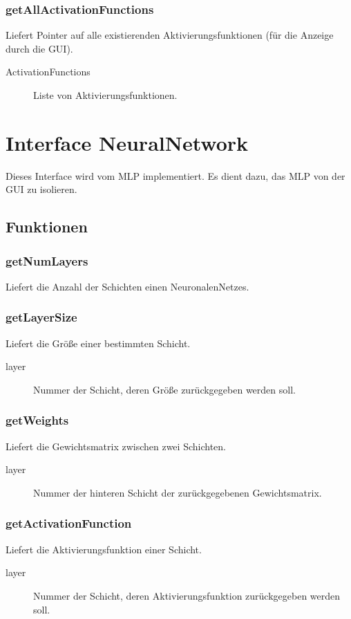 \documentclass[a4paper,10pt]{scrartcl}
\begin{document}
\subsubsection{getAllActivationFunctions}
Liefert Pointer auf alle existierenden Aktivierungsfunktionen (für die Anzeige durch die GUI).
\begin{description}
 \item[ActivationFunctions] Liste von Aktivierungsfunktionen.
\end{description}



\section{Interface NeuralNetwork}
Dieses Interface wird vom MLP implementiert. Es dient dazu, das MLP von der GUI zu isolieren.
\subsection{Funktionen}
\subsubsection{getNumLayers}
Liefert die Anzahl der Schichten einen NeuronalenNetzes.


\subsubsection{getLayerSize}
Liefert die Größe einer bestimmten Schicht.
\begin{description}
 \item[layer] Nummer der Schicht, deren Größe zurückgegeben werden soll.
\end{description}


\subsubsection{getWeights}
Liefert die Gewichtsmatrix zwischen zwei Schichten.
\begin{description}
\item[layer] Nummer der hinteren Schicht der zurückgegebenen Gewichtsmatrix.
\end{description}


\subsubsection{getActivationFunction}
Liefert die Aktivierungsfunktion einer Schicht.
\begin{description}
\item[layer] Nummer der Schicht, deren Aktivierungsfunktion zurückgegeben werden soll.
\end{description}
\end{document}
